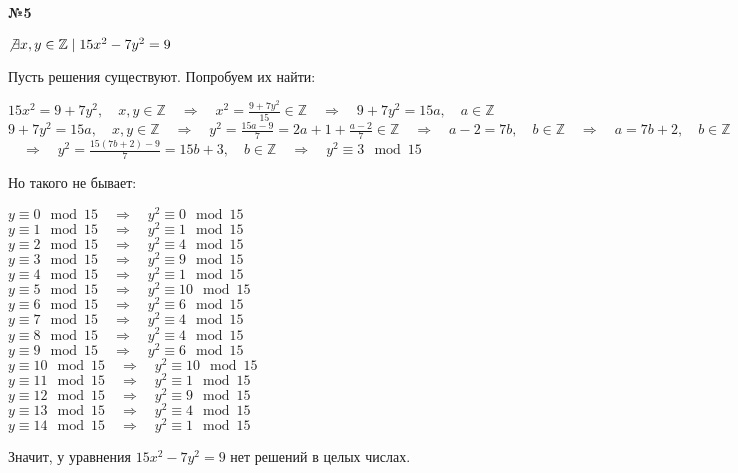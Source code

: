 \documentclass{article}
\newenvironment{task}{\begin{center}\fontsize{14}{14}\selectfont\bf}{\rm\fontsize{12}{12}\selectfont\end{center}}
\newcommand{\rimpl}{\quad\Rightarrow\quad}
\newcommand{\Z}{\mathbb{Z}}
\begin{document}
	\begin{task} 
		№5
	\end{task}
	\begin{center}
		$\not\exists x, y \in \mathbb{Z} \mid 15x^2 - 7y^2 = 9$
	\end{center}
	Пусть решения существуют. Попробуем их найти:
	\begin{center}
		$15x^2 = 9+7y^2, \quad x,y \in\Z \rimpl x^2 = \frac{9 + 7y^2}{15} \in \Z \rimpl 9+7y^2 = 15a, \quad a\in\Z $ \\
		$9+7y^2 = 15a, \quad x,y \in\Z \rimpl y^2 = \frac{15a-9}{7} = 2a+1 + \frac{a-2}{7} \in\Z \rimpl a-2 = 7b, \quad b\in\Z \rimpl a = 7b+2, \quad b\in\Z$\\
		$\rimpl y^2 = \frac{15(7b+2)-9}{7} = 15b+3, \quad b\in\Z \rimpl y^2 \equiv 3 \mod 15 $
	\end{center}
	Но такого не бывает:
	\begin{center}
		$y \equiv 0\mod15 \rimpl y^2 \equiv 0 \mod15$ \\
		$y \equiv 1\mod15 \rimpl y^2 \equiv 1 \mod15$ \\
		$y \equiv 2\mod15 \rimpl y^2 \equiv 4 \mod15$ \\
		$y \equiv 3\mod15 \rimpl y^2 \equiv 9 \mod15$ \\
		$y \equiv 4\mod15 \rimpl y^2 \equiv 1 \mod15$ \\
		$y \equiv 5\mod15 \rimpl y^2 \equiv 10 \mod15$ \\
		$y \equiv 6\mod15 \rimpl y^2 \equiv 6 \mod15$ \\
		$y \equiv 7\mod15 \rimpl y^2 \equiv 4 \mod15$ \\
		$y \equiv 8\mod15 \rimpl y^2 \equiv 4 \mod15$ \\
		$y \equiv 9\mod15 \rimpl y^2 \equiv 6 \mod15$ \\
		$y \equiv 10\mod15 \rimpl y^2 \equiv 10 \mod15$ \\
		$y \equiv 11\mod15 \rimpl y^2 \equiv 1 \mod15$ \\
		$y \equiv 12\mod15 \rimpl y^2 \equiv 9 \mod15$ \\
		$y \equiv 13\mod15 \rimpl y^2 \equiv 4 \mod15$ \\
		$y \equiv 14\mod15 \rimpl y^2 \equiv 1 \mod15$ \\
	\end{center}
	Значит, у уравнения $15x^2 - 7y^2 = 9$ нет решений в целых числах.
	
	
	
	
	
	
	
	
	
	
	
	
	
	
	
\end{document}
